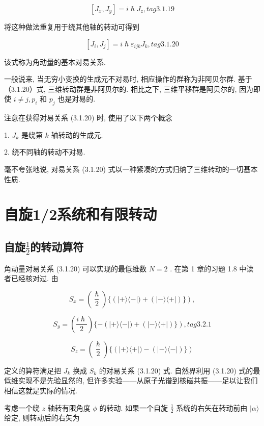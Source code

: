 $$
\left\lbrack {{J}_{x},{J}_{y}}\right\rbrack = i\hslash {J}_{z}, tag{3.1.19}
$$

将这种做法重复用于绕其他轴的转动可得到

$$
\left\lbrack {{J}_{i},{J}_{j}}\right\rbrack = i\hslash {\varepsilon }_{ijk}{J}_{k}, tag{3.1.20}
$$

该式称为角动量的基本对易关系.

一般说来, 当无穷小变换的生成元不对易时, 相应操作的群称为非阿贝尔群. 基于 （3.1.20）式, 三维转动群是非阿贝尔的. 相比之下, 三维平移群是阿贝尔的, 因为即使 $i \neq j,{p}_{i}$ 和 ${p}_{j}$ 也是对易的.

注意在获得对易关系 (3.1.20) 时, 使用了以下两个概念

1. ${J}_{k}$ 是绕第 $k$ 轴转动的生成元.

2. 绕不同轴的转动不对易.

毫不夸张地说, 对易关系 (3.1.20) 式以一种紧凑的方式归纳了三维转动的一切基本性质.

\section{自旋1/2系统和有限转动}
\subsection{自旋$\frac{1}{2}$的转动算符}

角动量对易关系 (3.1.20) 可以实现的最低维数 $N = 2$ . 在第 1 章的习题 1.8 中读者已经核对过. 由

$$
{S}_{x} = \left( \frac{\hslash }{2}\right) \{ \left( {\left| {+\rangle \langle - }\right| ) + \left( \left| {-\rangle \langle + }\right| \right) \} }\right) ,
$$

$$
{S}_{y} = \left( \frac{i\hslash }{2}\right) \{ - \left( {\left| {+\rangle \langle - }\right| ) + \left( \left| {-\rangle \langle + }\right| \right) \} }\right) , tag{3.2.1}
$$

$$
{S}_{z} = \left( \frac{\hslash }{2}\right) \{ \left( {\left| {+\rangle \langle + }\right| ) - \left( \left| {-\rangle \langle - }\right| \right) \} }\right)
$$

定义的算符满足把 ${J}_{k}$ 换成 ${S}_{k}$ 的对易关系 (3.1.20) 式. 自然界利用 (3.1.20) 式的最低维实现不是先验显然的, 但许多实验——从原子光谱到核磁共振——足以让我们相信这就是实际的情况.

考虑一个绕 $z$ 轴转有限角度 $\phi$ 的转动. 如果一个自旋 $\frac{1}{2}$ 系统的右矢在转动前由 $|\alpha \rangle$ 给定, 则转动后的右矢为

